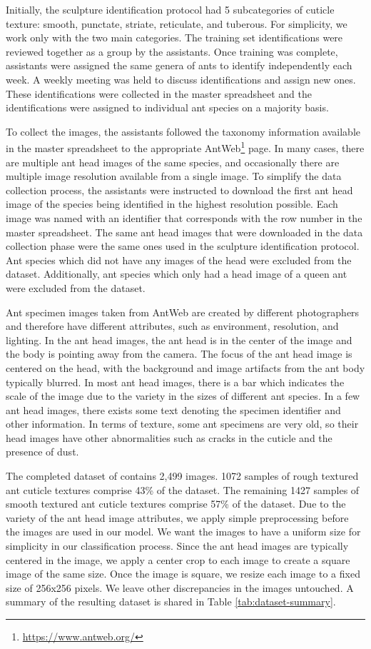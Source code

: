 \documentclass{aci}
\numberwithin{equation}{section}
\begin{document}
Initially, the sculpture identification protocol had 5 subcategories of cuticle
texture: smooth, punctate, striate, reticulate, and tuberous. For simplicity, we
work only with the two main categories. The training set identifications were
reviewed together as a group by the assistants. Once training was complete,
assistants were assigned the same genera of ants to identify independently each
week. A weekly meeting was held to discuss identifications and assign new ones.
These identifications were collected in the master spreadsheet and the
identifications were assigned to individual ant species on a majority basis.

To collect the images, the assistants followed the taxonomy information
available in the master spreadsheet to the appropriate
AntWeb\footnote{\url{https://www.antweb.org/}} page. In many cases, there are
multiple ant head images of the same species, and occasionally there are
multiple image resolution available from a single image. To simplify the data
collection process, the assistants were instructed to download the first ant
head image of the species being identified in the highest resolution possible.
Each image was named with an identifier that corresponds with the row number in
the master spreadsheet. The same ant head images that were downloaded in the
data collection phase were the same ones used in the sculpture identification
protocol. Ant species which did not have any images of the head were excluded
from the dataset. Additionally, ant species which only had a head image of a
queen ant were excluded from the dataset.

Ant specimen images taken from AntWeb \cite{perrichot_antweb_2012} are created
by different photographers and therefore have different attributes, such as
environment, resolution, and lighting. In the ant head images, the ant head is
in the center of the image and the body is pointing away from the camera. The
focus of the ant head image is centered on the head, with the background and
image artifacts from the ant body typically blurred. In most ant head images,
there is a bar which indicates the scale of the image due to the variety in the
sizes of different ant species. In a few ant head images, there exists some text
denoting the specimen identifier and other information. In terms of texture,
some ant specimens are very old, so their head images have other abnormalities
such as cracks in the cuticle and the presence of dust.

The completed dataset of contains 2,499 images. 1072 samples of rough textured
ant cuticle textures comprise 43\% of the dataset. The remaining 1427 samples of
smooth textured ant cuticle textures comprise 57\% of the dataset. Due to the
variety of the ant head image attributes, we apply simple preprocessing before
the images are used in our model. We want the images to have a uniform size for
simplicity in our classification process. Since the ant head images are
typically centered in the image, we apply a center crop to each image to create
a square image of the same size. Once the image is square, we resize each image
to a fixed size of 256x256 pixels. We leave other discrepancies in the images
untouched. A summary of the resulting dataset is shared in Table
\ref{tab:dataset-summary}.
\end{document}
